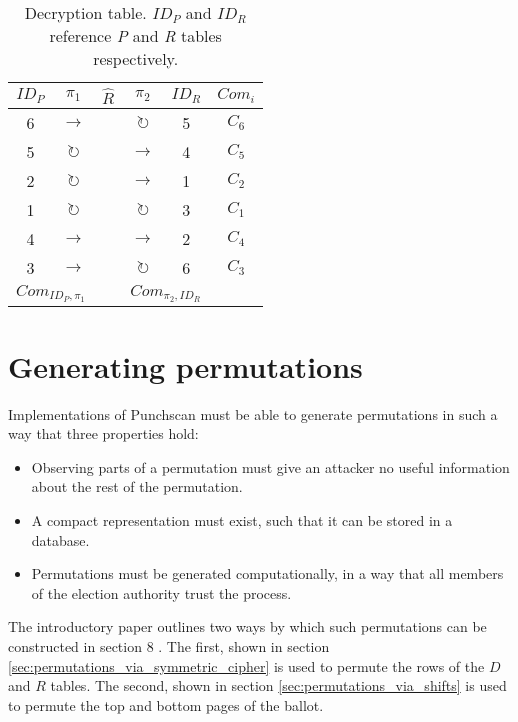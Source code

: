 \begin{table}
	\centering
	\begin{tabular}{|c|c|c|c|c|c|}
		\hline
		$ID_P$ & $\pi_1$ & $\hat{R}$ & $\pi_2$ & $ID_R$ & $Com_{i}$ \\
		\hline
		6 & $\rightarrow$       & & $\circlearrowright$ & 5 & $C_6$ \\
		5 & $\circlearrowright$ & & $\rightarrow$       & 4 & $C_5$ \\
		2 & $\circlearrowright$ & & $\rightarrow$       & 1 & $C_2$ \\
		1 & $\circlearrowright$ & & $\circlearrowright$ & 3 & $C_1$ \\
		4 & $\rightarrow$       & & $\rightarrow$       & 2 & $C_4$ \\
		3 & $\rightarrow$       & & $\circlearrowright$ & 6 & $C_3$ \\
		\hline
		\multicolumn{2}{|c|}{$Com_{ID_P, \pi_1}$} &   & \multicolumn{2}{c|}{$Com_{\pi_2, ID_R}$} & \\
		\hline
	\end{tabular}
	\caption{Decryption table. $ID_P$ and $ID_R$ reference \emph{P} and \emph{R} tables respectively.}
	\label{tbl:d_table_full}
\end{table}

\section{Generating permutations}
\label{sec:generating_permutations}

Implementations of Punchscan must be able to generate permutations in such a
way that three properties hold:
\begin{itemize}
	\item Observing parts of a permutation must give an attacker no useful information about the rest of the permutation.
	\item A compact representation must exist, such that it can be stored in a database.
	\item Permutations must be generated computationally, in a way that all
		members of the election authority trust the process.
\end{itemize}

The introductory paper outlines two ways by which such permutations can be
constructed in section 8 \autocite{fisherPunchscanIntroductionSystem2006}. The
first, shown in section \ref{sec:permutations_via_symmetric_cipher} is used to
permute the rows of the $D$ and $R$ tables. The second, shown in section
\ref{sec:permutations_via_shifts} is used to permute the top and bottom pages
of the ballot.

